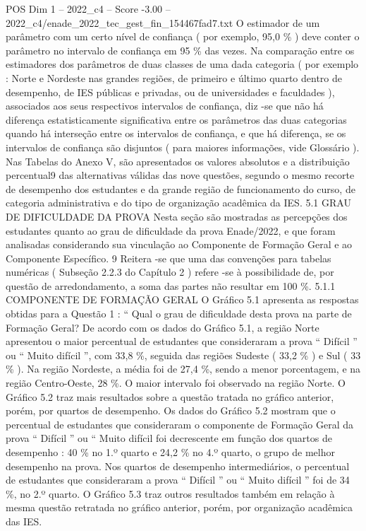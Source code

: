 \begin{textsample}{POS Dim 1 – 2022\_c4 – Score -3.00 – 2022\_c4/enade\_2022\_tec\_gest\_fin\_154467fad7.txt}
O estimador de um parâmetro com um certo nível de confiança ( por exemplo, 95,0 \% ) deve conter o parâmetro no intervalo de confiança em 95 \% das vezes.
Na comparação entre os estimadores dos parâmetros de duas classes de uma dada categoria ( por exemplo : Norte e Nordeste nas grandes regiões, de primeiro e último quarto dentro de desempenho, de IES públicas e privadas, ou de universidades e faculdades ), associados aos seus respectivos intervalos de confiança, diz -se que não há diferença estatisticamente significativa entre os parâmetros das duas categorias quando há interseção entre os intervalos de confiança, e que há diferença, se os intervalos de confiança são disjuntos ( para maiores informações, vide Glossário ).
Nas Tabelas do Anexo V, são apresentados os valores absolutos e a distribuição percentual9 das alternativas válidas das nove questões, segundo o mesmo recorte de desempenho dos estudantes e da grande região de funcionamento do curso, de categoria administrativa e do tipo de organização acadêmica da IES. 5.1 GRAU DE DIFICULDADE DA PROVA Nesta seção são mostradas as percepções dos estudantes quanto ao grau de dificuldade da prova Enade/2022, e que foram analisadas considerando sua vinculação ao Componente de Formação Geral e ao Componente Específico. 9 Reitera -se que uma das convenções para tabelas numéricas ( Subseção 2.2.3 do Capítulo 2 ) refere -se à possibilidade de, por questão de arredondamento, a soma das partes não resultar em 100 \%. 5.1.1 COMPONENTE DE FORMAÇÃO GERAL O Gráfico 5.1 apresenta as respostas obtidas para a Questão 1 : “ Qual o grau de dificuldade desta prova na parte de Formação Geral?
De acordo com os dados do Gráfico 5.1, a região Norte apresentou o maior percentual de estudantes que consideraram a prova “ Difícil ” ou “ Muito difícil ”, com 33,8 \%, seguida das regiões Sudeste ( 33,2 \% ) e Sul ( 33 \% ).
Na região Nordeste, a média foi de 27,4 \%, sendo a menor porcentagem, e na região Centro-Oeste, 28 \%.
O maior intervalo foi observado na região Norte.
O Gráfico 5.2 traz mais resultados sobre a questão tratada no gráfico anterior, porém, por quartos de desempenho.
Os dados do Gráfico 5.2 mostram que o percentual de estudantes que consideraram o componente de Formação Geral da prova “ Difícil ” ou “ Muito difícil foi decrescente em função dos quartos de desempenho : 40 \% no 1.º quarto e 24,2 \% no 4.º quarto, o grupo de melhor desempenho na prova.
Nos quartos de desempenho intermediários, o percentual de estudantes que consideraram a prova “ Difícil ” ou “ Muito difícil ” foi de 34 \%, no 2.º quarto.
O Gráfico 5.3 traz outros resultados também em relação à mesma questão retratada no gráfico anterior, porém, por organização acadêmica das IES.

\end{textsample}
